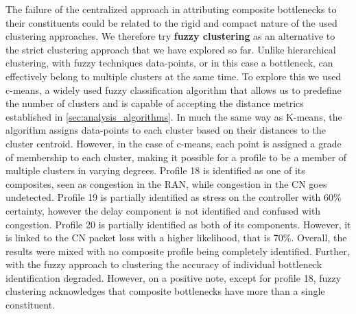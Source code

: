 \documentclass[journal,comsoc]{IEEEtran}
\begin{document}
The failure of the centralized approach in attributing composite bottlenecks to their constituents could be related to the rigid and compact nature of the used clustering approaches.    
We therefore try \textbf{fuzzy clustering} as an alternative to the strict clustering approach that we have explored so far.
Unlike hierarchical clustering, with fuzzy techniques data-points, or in this case a bottleneck, can effectively belong to multiple clusters at the same time.
To explore this we used c-means\cite{bezdek1984fcm}, a widely used fuzzy classification algorithm that allows us to predefine the number of clusters and is capable of accepting the distance metrics established in \ref{sec:analysis_algorithms}.
In much the same way as K-means, the algorithm assigns data-points to each cluster based on their distances to the cluster centroid.
However, in the case of c-means, each point is assigned a grade of membership to each cluster, making it possible for a profile to be a member of multiple clusters in varying degrees.
Profile 18 is identified as one of its composites, seen as congestion in the RAN, while congestion in the CN goes undetected.
Profile 19 is partially identified as stress on the controller with 60\% certainty, however the delay component is not identified and confused with congestion.
Profile 20 is partially identified as both of its components.
However, it is linked to the CN packet loss with a higher likelihood, that is 70\%.
Overall, the results were mixed with no composite profile being completely identified.
Further, with the fuzzy approach to clustering the accuracy of individual bottleneck identification degraded. 
However, on a positive note, except for profile 18, fuzzy clustering acknowledges that composite bottlenecks have more than a single constituent.
\end{document}
